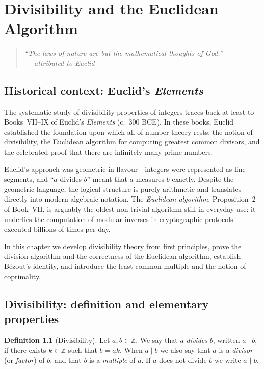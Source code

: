 \documentclass[12pt,a4paper,openany]{book}
\theoremstyle{definition}
\newtheorem{definition}{Definition}[chapter]
\theoremstyle{plain}
\theoremstyle{remark}
\newcommand{\Z}{\mathbb{Z}}
\begin{document}
\chapter{Divisibility and the Euclidean Algorithm}
\label{ch:divisibility}

\begin{quote}
\itshape
``The laws of nature are but the mathematical thoughts of God.''\\
--- attributed to Euclid
\end{quote}

\section{Historical context: Euclid's \textit{Elements}}
\label{sec:euclid-history}

The systematic study of divisibility properties of integers traces back at least
to Books~VII--IX of Euclid's \textit{Elements} (c.~300 BCE). In these books,
Euclid established the foundation upon which all of number theory rests: the
notion of divisibility, the Euclidean algorithm for computing greatest common
divisors, and the celebrated proof that there are infinitely many prime numbers.

Euclid's approach was geometric in flavour---integers were represented as line
segments, and ``$a$ divides $b$'' meant that $a$ measures $b$ exactly. Despite
the geometric language, the logical structure is purely arithmetic and translates
directly into modern algebraic notation. The \emph{Euclidean algorithm},
Proposition~2 of Book~VII, is arguably the oldest non-trivial algorithm still
in everyday use: it underlies the computation of modular inverses in
cryptographic protocols executed billions of times per day.

In this chapter we develop divisibility theory from first principles, prove the
division algorithm and the correctness of the Euclidean algorithm, establish
B\'{e}zout's identity, and introduce the least common multiple and the notion
of coprimality.

\section{Divisibility: definition and elementary properties}
\label{sec:divisibility-def}

\begin{definition}[Divisibility]
\label{def:divisibility}
Let $a,b \in \Z$. We say that $a$ \emph{divides} $b$, written
$a \mid b$, if there exists $k \in \Z$ such that $b = ak$. When $a \mid b$ we
also say that $a$ is a \emph{divisor} (or \emph{factor}) of $b$,
and that $b$ is a \emph{multiple} of $a$. If $a$ does not
divide $b$ we write $a \nmid b$.
\end{definition}
\end{document}
